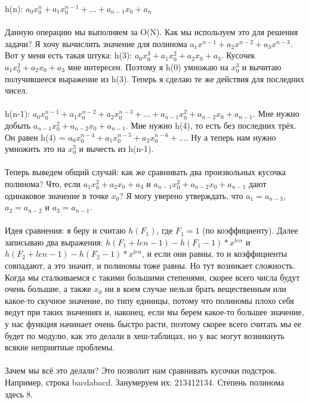 \documentclass[a4paper,12pt]{article}
\begin{document}
h(n): $a_{0}x_{0}^{n} + a_{1}x_{0}^{n-1} + ... + a_{n-1}x_{0} + a_{n}$\\ \\
Данную операцию мы выполняем за O(N). Как мы используем это для решения задачи? Я хочу вычислить значение для полинома $a_{1}x^{n-1} + a_{2}x^{n-2} + a_{3}x^{n-3}$. Вот у меня есть такая штука: h(3): $a_{0}x_{0}^{3} + a_{1}x_{0}^{2} + a_{2}x_{0} + a_{3}$. Кусочек $a_{1}x_{0}^{2} + a_{2}x_{0} + a_{3}$ мне интересен. Поэтому я h(0) умножаю на $x_{0}^{3}$ и вычитаю получившееся выражение из h(3). Теперь я сделаю те же действия для последних чисел. \\ \\
h(n-1): $a_{0}x_{0}^{n-1} + a_{1}x_{0}^{n-2} + a_{2}x_{0}^{n-3} + ... + a_{n-1}x_{0}^{2} + a_{n-2}x_{0} + a_{n-1}$. Мне нужно добыть $a_{n-1}x_{0}^{2} + a_{n-2}x_{0} + a_{n-1}$. Мне нужно h(4), то есть без последних трёх. Он равен h(4) = $a_{0}x_{0}^{n-4} + a_{1}x_{0}^{n-5} + a_{2}x_{0}^{n-6} + ...$. Ну а теперь нам нужно умножить это на $x_{0}^3$ и вычесть из h(n-1). \\
\\
Теперь выведем общий случай: как же сравнивать два произвольных кусочка полинома? Что, если $a_{1}x_{0}^{2} + a_{2}x_{0} + a_{3}$ и $a_{n-1}x_{0}^{2} + a_{n-2}x_{0} + a_{n-1}$ дают одинаковое значение в точке $x_{0}$? Я могу уверено утверждать, что $a_{1} = a_{n-3}$, $a_{2} = a_{n-2}$ и $a_{3} = a_{n-1}$. \\
\\
Идея сравнения: я беру и считаю $h(F_{1})$, где $F_{1} = 1$ (по коэффициенту). Далее записываю два выражения: $h(F_{1} + len - 1) - h(F_{1} - 1) * x^{len}$ и $h(F_{2} + len - 1) - h(F_{2} - 1) * x^{len}$, и если они равны, то и коэффициенты совпадают, а это значит, и полиномы тоже равны. Но тут возникает сложность. Когда мы сталкиваемся с такими большими степенями, скорее всего числа будут очень большие, а также $x_0$ ни в коем случае нельзя брать вещественным или какое-то скучное значение, по типу единицы, потому что полиномы плохо себя ведут при таких значениях и, наконец, если мы берем какое-то большее значение, у нас функция начинает очень быстро расти, поэтому скорее всего считать мы ее будет по модулю, как это делали в хеш-таблицах, но у вас могут возникнуть всякие неприятные проблемы.\\ \\
Зачем мы всё это делали? Это позволит нам сравнивать кусочки подстрок. Например, строка bacdabacd. Занумеруем их: 213412134. Степень полинома здесь 8.\\ \\
\end{document}
